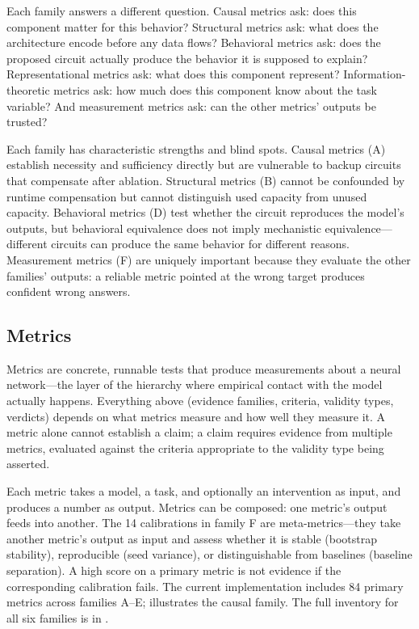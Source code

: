 \documentclass[10pt]{article}
\begin{document}
Each family answers a different question. Causal metrics ask: does this component matter for this behavior? Structural metrics ask: what does the architecture encode before any data flows? Behavioral metrics ask: does the proposed circuit actually produce the behavior it is supposed to explain? Representational metrics ask: what does this component represent? Information-theoretic metrics ask: how much does this component know about the task variable? And measurement metrics ask: can the other metrics' outputs be trusted?

Each family has characteristic strengths and blind spots. Causal metrics (A) establish necessity and sufficiency directly but are vulnerable to backup circuits that compensate after ablation. Structural metrics (B) cannot be confounded by runtime compensation but cannot distinguish used capacity from unused capacity. Behavioral metrics (D) test whether the circuit reproduces the model's outputs, but behavioral equivalence does not imply mechanistic equivalence---different circuits can produce the same behavior for different reasons. Measurement metrics (F) are uniquely important because they evaluate the other families' outputs: a reliable metric pointed at the wrong target produces confident wrong answers.

\subsection{Metrics}
\label{sec:metrics}

Metrics are concrete, runnable tests that produce measurements about a neural network---the layer of the hierarchy where empirical contact with the model actually happens. Everything above (evidence families, criteria, validity types, verdicts) depends on what metrics measure and how well they measure it. A metric alone cannot establish a claim; a claim requires evidence from multiple metrics, evaluated against the criteria appropriate to the validity type being asserted.

Each metric takes a model, a task, and optionally an intervention as input, and produces a number as output. Metrics can be composed: one metric's output feeds into another. The 14 calibrations in family F are meta-metrics---they take another metric's output as input and assess whether it is stable (bootstrap stability), reproducible (seed variance), or distinguishable from baselines (baseline separation). A high score on a primary metric is not evidence if the corresponding calibration fails. The current implementation includes 84 primary metrics across families A--E;  illustrates the causal family. The full inventory for all six families is in .
\end{document}
